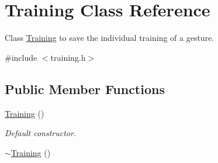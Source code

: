 \hypertarget{class_training}{\section{\-Training \-Class \-Reference}
\label{class_training}
}


\-Class \hyperlink{class_training}{\-Training} to save the individual training of a gesture.  




{\ttfamily \#include $<$training.\-h$>$}

\subsection*{\-Public \-Member \-Functions}
\begin{DoxyCompactItemize}
\item 
\hypertarget{class_training_af98b1bc7ed710e2fa008a72ad29dbdae}{\hyperlink{class_training_af98b1bc7ed710e2fa008a72ad29dbdae}{\-Training} ()}\label{class_training_af98b1bc7ed710e2fa008a72ad29dbdae}

\begin{DoxyCompactList}\small\item\em \-Default constructor. \end{DoxyCompactList}\item 
\hypertarget{class_training_a6db6a1a9302641ca0d74308e583667af}{\hyperlink{class_training_a6db6a1a9302641ca0d74308e583667af}{$\sim$\-Training} ()}\label{class_training_a6db6a1a9302641ca0d74308e583667af}


\end{DoxyCompactItemize}
